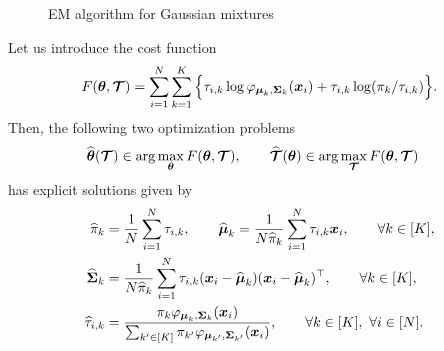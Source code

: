 \begin{figure}[ht]
\begin{center}
   \caption{EM algorithm for Gaussian mixtures}
   \label{algo:EM}
\end{center}
\end{figure}
\begin{lem}
\label{lemma1}
Let us introduce the cost function
\begin{equation}
\label{cost_gmm_em}
F({\boldsymbol\theta},\boldsymbol{\mathcal T}) = \sum_{i=1}^{N} \sum_{k=1}^K \Big\{\tau_{i,k}\log\varphi_{\boldsymbol\mu_{k},\boldsymbol\Sigma_{k}}(\boldsymbol x_i)+\tau_{i,k}
    \log(\pi_k/\tau_{i,k})\Big\}.
\end{equation}
Then, the following two optimization problems
\begin{align}
\widehat{{\boldsymbol\theta}}(\boldsymbol{\mathcal T})&\in \arg\max_{{\boldsymbol\theta}} F({\boldsymbol\theta},\boldsymbol{\mathcal T}),\qquad \widehat{\boldsymbol{\mathcal T}}({\boldsymbol\theta})\in \arg\max_{\boldsymbol{\mathcal T}} F({\boldsymbol\theta},\boldsymbol{\mathcal T})
\end{align}
has explicit solutions given by
\begin{align}
\label{em-sols}
\widehat\pi_k     &= \frac1N\sum_{i=1}^N \tau_{i,k},\qquad\widehat{\boldsymbol\mu}_k = \frac1{N\widehat\pi_k}\sum_{i=1}^N \tau_{i,k}\boldsymbol x_i ,\qquad \forall k\in[K],\\
\widehat{\boldsymbol\Sigma}_k &= \frac1{N\widehat\pi_k}\sum_{i=1}^N \tau_{i,k}(\boldsymbol x_i-\widehat{\boldsymbol\mu}_k)(\boldsymbol x_i-\widehat{\boldsymbol\mu}_k)^\top,\qquad\forall k\in[K],\\
\widehat\tau_{i,k}&= \frac{\pi_k\varphi_{\boldsymbol\mu_k,\boldsymbol\Sigma_k}(\boldsymbol x_i)}{\sum_{k'\in[K]}\pi_{k'}\varphi_{\boldsymbol\mu_{k'},\boldsymbol\Sigma_{k'}}(\boldsymbol x_i)},\qquad\forall k\in[K],\ \forall i\in[N] \label{tau_ik_em}.
\end{align}
\end{lem}
